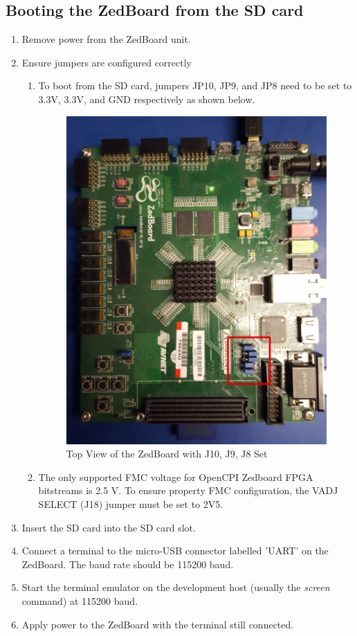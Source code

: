 \subsection{Booting the ZedBoard from the SD card}
\begin{enumerate}
\item Remove power from the ZedBoard unit.
\item Ensure jumpers are configured correctly
\begin{enumerate}
\item To boot from the SD card, jumpers JP10, JP9, and JP8 need to be set to 3.3V, 3.3V, and GND respectively as shown below.
\begin{figure}[ht]
	\centerline{\includegraphics[scale=0.15]{zed_top}}
	\caption{Top View of the ZedBoard with J10, J9, J8 Set}
	\label{fig:zed_top}
\end{figure}
\item The only supported FMC voltage for OpenCPI Zedboard FPGA bitstreams is 2.5 V. To ensure property FMC configuration, the VADJ SELECT (J18) jumper must be set to 2V5.
\end{enumerate}
\item Insert the SD card into the SD card slot.
\item Connect a terminal to the micro-USB connector labelled 'UART' on the ZedBoard. The baud rate should be 115200 baud.
\item Start the terminal emulator on the development host (usually the \textit{screen} command) at 115200 baud.
\item Apply power to the ZedBoard with the terminal still connected.
\end{enumerate}

